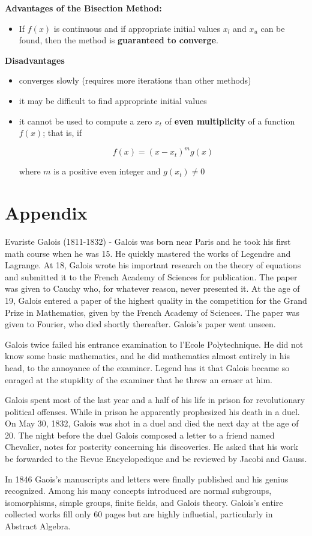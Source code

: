\documentclass [titlepage,12pt,letter] {article}
\begin{document}
{\bf Advantages of the Bisection Method:}
\begin{itemize}
\item{If $f(x)$ is continuous and if appropriate initial values $x_l$ and $x_u$ can be found, then the method is {\bf guaranteed to converge}.}
\end{itemize}

{\bf Disadvantages}
\begin{itemize}
\item{converges slowly (requires more iterations than other methods)}
\item{it may be difficult to find appropriate initial values}
\item{it cannot be used to compute a zero $x_t$ of {\bf even multiplicity} of a function $f(x)$; that is, if}

\[
f(x)=(x-x_t)^mg(x)
\]

\noindent
where $m$ is a positive even integer and $g(x_t) \neq 0$


\end{itemize}

\section*{Appendix} 

Evariste Galois (1811-1832) - Galois was born near Paris and he took his first math course when he was 15. He quickly mastered the works of Legendre and Lagrange. At 18, Galois wrote his important research on the theory of equations and submitted it to the French Academy of Sciences for publication. The paper was given to Cauchy who, for whatever reason, never presented it. At the age of 19, Galois entered a paper of the highest quality in the competition for the Grand Prize in Mathematics, given by the French Academy of Sciences. The paper was given to Fourier, who died shortly thereafter. Galois's paper went unseen.

Galois twice failed his entrance examination to l'Ecole Polytechnique. He did not know some basic mathematics, and he did mathematics almost entirely in his head, to the annoyance of the examiner. Legend has it that Galois became so enraged at the stupidity of the examiner that he threw an eraser at him.

Galois spent most of the last year and a half of his life in prison for revolutionary political offenses. While in prison he apparently prophesized his death in a duel. On May 30, 1832, Galois was shot in a duel and died the next day at the age of 20. The night before the duel Galois composed a letter to a friend named Chevalier, notes for posterity concerning his discoveries. He asked that his work be forwarded to the Revue Encyclopedique and be reviewed by Jacobi and Gauss.

In 1846 Gaois's manuscripts and letters were finally published and his genius recognized. Among his many concepts introduced are normal subgroups, isomorphisms, simple groups, finite fields, and Galois theory. Galois's entire collected works fill only 60 pages but are highly influetial, particularly in Abstract Algebra.

 
 
\end{document}
